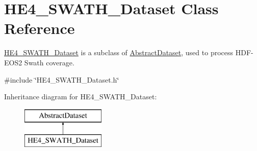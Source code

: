 \hypertarget{classHE4__SWATH__Dataset}{
\section{HE4\_\-SWATH\_\-Dataset Class Reference}
\label{classHE4__SWATH__Dataset}
}


\hyperlink{classHE4__SWATH__Dataset}{HE4\_\-SWATH\_\-Dataset} is a subclass of \hyperlink{classAbstractDataset}{AbstractDataset}, used to process HDF-\/EOS2 Swath coverage.  




{\ttfamily \#include \char`\"{}HE4\_\-SWATH\_\-Dataset.h\char`\"{}}

Inheritance diagram for HE4\_\-SWATH\_\-Dataset:\begin{figure}[H]
\begin{center}
\leavevmode
\includegraphics[height=2.000000cm]{classHE4__SWATH__Dataset}
\end{center}
\end{figure}
